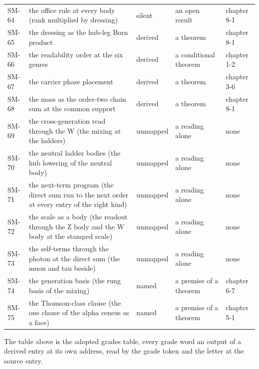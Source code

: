 {\begin{longtable}{@{}lp{58mm}llp{30mm}@{}}
SM-64 & the office rule at every body (rank multiplied by dressing) & silent & an open result & chapter 8-1 \\
SM-65 & the dressing as the hub-leg Born product & derived & a theorem & chapter 8-1 \\
SM-66 & the readability order at the six genres & derived & a conditional theorem & chapter 1-2 \\
SM-67 & the carrier phase placement & derived & a theorem & chapter 3-6 \\
SM-68 & the mass as the order-two chain sum at the common support & derived & a theorem & chapter 8-1 \\
SM-69 & the cross-generation read through the W (the mixing at the ladders) & unmapped & a reading alone & none \\
SM-70 & the neutral ladder bodies (the hub lowering of the neutral body) & unmapped & a reading alone & none \\
SM-71 & the next-term program (the direct sum run to the next order at every entry of the right kind) & unmapped & a reading alone & none \\
SM-72 & the scale as a body (the readout through the Z body and the W body at the stamped scale) & unmapped & a reading alone & none \\
SM-73 & the self-terms through the photon at the direct sum (the muon and tau beside) & unmapped & a reading alone & none \\
SM-74 & the generation basis (the rung basis of the mixing) & named & a premise of a theorem & chapter 6-7 \\
SM-75 & the Thomson-class clause (the one clause of the alpha census as a face) & named & a premise of a theorem & chapter 5-1 \\
\hline
\end{longtable}}
\chdeps{}{}
The table above is the adopted grades table, every grade word an output of a derived entry at its own address, read by the grade token and the letter at the source entry.

